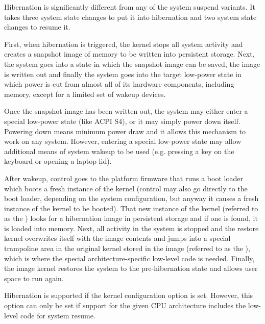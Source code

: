 \documentclass[a4paper,8pt,english]{sphinxmanual}
\begin{document}
Hibernation is significantly different from any of the system suspend variants.
It takes three system state changes to put it into hibernation and two system
state changes to resume it.

First, when hibernation is triggered, the kernel stops all system activity and
creates a snapshot image of memory to be written into persistent storage.  Next,
the system goes into a state in which the snapshot image can be saved, the image
is written out and finally the system goes into the target low-power state in
which power is cut from almost all of its hardware components, including memory,
except for a limited set of wakeup devices.

Once the snapshot image has been written out, the system may either enter a
special low-power state (like ACPI S4), or it may simply power down itself.
Powering down means minimum power draw and it allows this mechanism to work on
any system.  However, entering a special low-power state may allow additional
means of system wakeup to be used  (e.g. pressing a key on the keyboard or
opening a laptop lid).

After wakeup, control goes to the platform firmware that runs a boot loader
which boots a fresh instance of the kernel (control may also go directly to
the boot loader, depending on the system configuration, but anyway it causes
a fresh instance of the kernel to be booted).  That new instance of the kernel
(referred to as the ) looks for a hibernation image in
persistent storage and if one is found, it is loaded into memory.  Next, all
activity in the system is stopped and the restore kernel overwrites itself with
the image contents and jumps into a special trampoline area in the original
kernel stored in the image (referred to as the ), which is where
the special architecture-specific low-level code is needed.  Finally, the
image kernel restores the system to the pre-hibernation state and allows user
space to run again.

Hibernation is supported if the  kernel
configuration option is set.  However, this option can only be set if support
for the given CPU architecture includes the low-level code for system resume.
\end{document}
